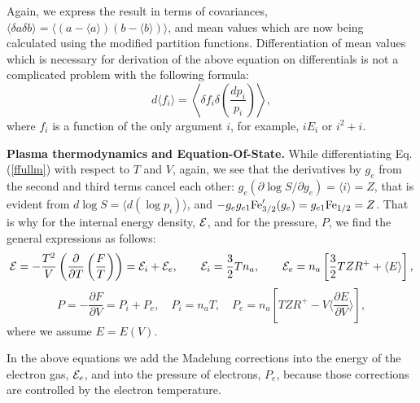 Again, we express the result in terms of covariances,
$\langle \delta a \delta b \rangle = \langle (a - \langle a \rangle) (b - \langle b \rangle) \rangle$,
and mean values which are now being calculated
using the modified partition functions.
Differentiation of mean values which is necessary for derivation of the above equation on
differentials is not a complicated problem with the following formula:
\begin{equation}
d \langle f_i \rangle = \left\langle \delta f_i \delta\left( \frac{dp_i}{p_i} \right) \right\rangle,
\end{equation}
where $f_i$ is a function of the only argument $i$, for example, $iE_i$ or $i^2+i$.

{\bf Plasma thermodynamics and Equation-Of-State.} 
While differentiating Eq.(\ref{ffullm}) with respect to $T$ and $V$, again, we see that the derivatives
by $g_e$ from the second and third terms cancel 
each other: $g_e(\partial \log S/\partial g_e)=\langle i\rangle=Z$,
that is evident from $d \log S = \langle d (\log p_i) \rangle$,
and $-g_eg_{e1}{\rm Fe}^\prime_{3/2}(g_e)=g_{e1}{\rm Fe}_{1/2}=Z$.
That is why for the internal energy density,
${\cal E}$, and for the pressure, $P$, we find the general expressions
as follows:
\begin{equation}\label{generalE}
{\cal E} = -\frac{T^2}V\left(\frac{\partial}{\partial T}\left(\frac F T\right)\right)=
{\cal E}_i+{\cal E}_e,\qquad{\cal E}_i=\frac32Tn_a,\qquad
{\cal E}_e = n_a\left[ \frac32 T Z R^+ + \langle E \rangle \right],
\end{equation}
\begin{equation}\label{generalP}
P = -\frac{\partial F}{\partial V}=P_i+P_e,\quad
P_i = n_aT,\quad
P_e = n_a \left[ T ZR^+ - V \langle \frac{\partial E}{\partial V} \rangle \right],
\end{equation}
where we assume $E=E(V)$.

In the above equations we add the Madelung corrections into the energy of the electron gas, ${\cal E}_e$, and
into the pressure of electrons, $P_e$, because those corrections are controlled by the electron temperature.

